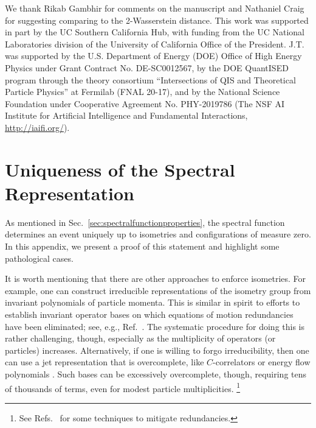 \documentclass[letterpaper,11pt]{article}
\DeclareRobustCommand{\Sec}[1]{Sec.~\ref{#1}}
\DeclareRobustCommand{\InRef}[1]{Ref.~\cite{#1}}
\DeclareRobustCommand{\Refs}[1]{Refs.~\cite{#1}}
\begin{document}
\begin{acknowledgments}

We thank Rikab Gambhir for comments on the manuscript and Nathaniel Craig for suggesting comparing to the 2-Wasserstein distance.
%
This work was supported in part by the UC Southern California Hub, with funding from the UC National Laboratories division of the University of California Office of the President.
%
J.T. was supported by the U.S. Department of Energy (DOE) Office of High Energy Physics under Grant Contract No. DE-SC0012567, by the DOE QuantISED program through the theory consortium ``Intersections of QIS and Theoretical Particle Physics” at Fermilab (FNAL 20-17), and by the National Science Foundation under Cooperative Agreement No. PHY-2019786 (The NSF AI Institute for Artificial Intelligence and Fundamental Interactions, \url{http://iaifi.org/}).

\end{acknowledgments}

\appendix


\section{Uniqueness of the Spectral Representation}
\label{app:uniqueness}

As mentioned in \Sec{sec:spectralfunctionproperties}, the spectral function determines an event uniquely up to isometries and configurations of measure zero.
%
In this appendix, we present a proof of this statement and highlight some pathological cases.


It is worth mentioning that there are other approaches to enforce isometries.
%
For example, one can construct irreducible representations of the isometry group from invariant polynomials of particle momenta.
%
This is similar in spirit to efforts to establish invariant operator bases on which equations of motion redundancies have been eliminated; see, e.g., \InRef{Henning:2015daa}.
%
The systematic procedure for doing this is rather challenging, though, especially as the multiplicity of operators (or particles) increases. 
%
Alternatively, if one is willing to forgo irreducibility, then one can use a jet representation that is overcomplete, like $C$-correlators \cite{Tkachov:1995kk} or energy flow polynomials \cite{Komiske:2017aww}.
%
Such bases can be excessively overcomplete, though, requiring tens of thousands of terms, even for modest particle multiplicities.%
%
\footnote{See \Refs{Komiske:2019asc,Cal:2022fnm} for some techniques to mitigate redundancies.}
\end{document}
